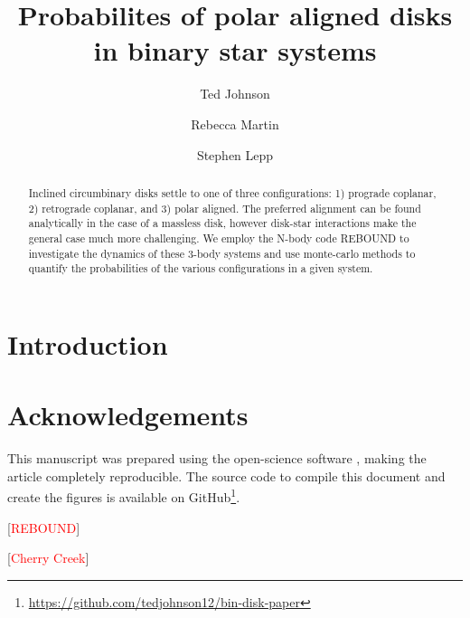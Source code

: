 \documentclass[twocolumn]{aastex631}
\newcommand\ghurl[0]{\url{https://github.com/tedjohnson12/bin-disk-paper}}
\begin{document}
\title{Probabilites of polar aligned disks in binary star systems}

\author{Ted Johnson}
\author{Rebecca Martin}
\author{Stephen Lepp}

\begin{abstract}
    Inclined circumbinary disks settle to one of three configurations: 1) prograde coplanar,
    2) retrograde coplanar, and 3) polar aligned. The preferred alignment can be found analytically
    in the case of a massless disk, however disk-star interactions make the general case much more challenging.
    We employ the N-body code REBOUND to investigate the dynamics of these 3-body systems and use monte-carlo methods
    to quantify the probabilities of the various configurations in a given system.
\end{abstract}

\section{Introduction}
\label{sec:intro}



\section{Acknowledgements}
\label{sec:ack}

This manuscript was prepared using the open-science software \href{https://show-your.work/en/latest/intro/}{\showyourwork} \citep{Luger2021}, making the article completely
reproducible. The source code to compile this document and create the figures is available on GitHub\footnote{\ghurl}.

[\textcolor{red}{REBOUND}]

[\textcolor{red}{Cherry Creek}]


\end{document}
